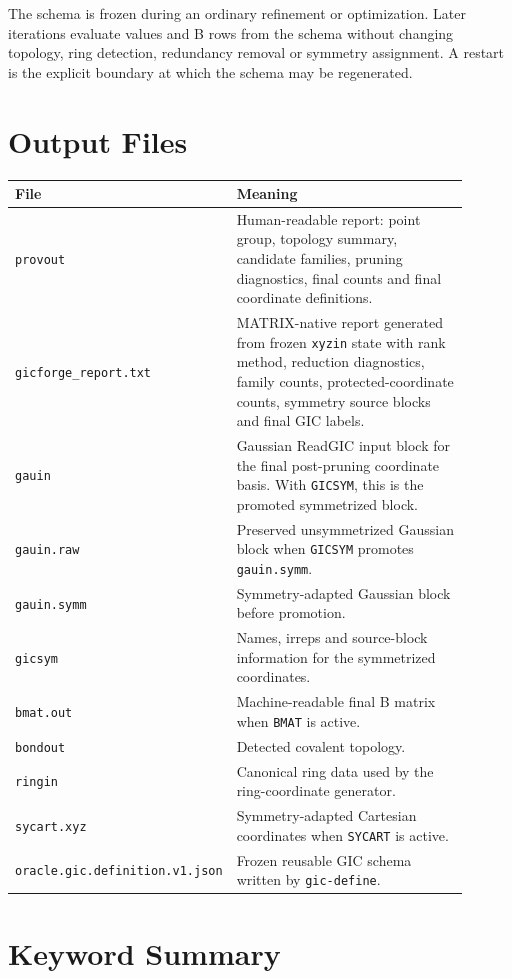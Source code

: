 \documentclass[11pt]{article}
\newcommand{\xyzin}{\texttt{xyzin}}
\newcommand{\provout}{\texttt{provout}}
\newcommand{\gauin}{\texttt{gauin}}
\newcommand{\gicsym}{\texttt{gicsym}}
\begin{document}
\noindent
The schema is frozen during an ordinary refinement or optimization.  Later
iterations evaluate values and B rows from the schema without changing
topology, ring detection, redundancy removal or symmetry assignment.  A restart
is the explicit boundary at which the schema may be regenerated.

\section{Output Files}

\begin{longtable}{@{}p{0.33\linewidth}p{0.57\linewidth}@{}}
\toprule
File & Meaning \\
\midrule
\endhead
\provout{} & Human-readable report: point group, topology summary, candidate
families, pruning diagnostics, final counts and final coordinate definitions. \\
\texttt{gicforge\_report.txt} & MATRIX-native report generated from frozen
\xyzin{} state with rank method, reduction diagnostics, family counts,
protected-coordinate counts, symmetry source blocks and final GIC labels. \\
\gauin{} & Gaussian ReadGIC input block for the final post-pruning coordinate
basis.  With \texttt{GICSYM}, this is the promoted symmetrized block. \\
\texttt{gauin.raw} & Preserved unsymmetrized Gaussian block when \texttt{GICSYM}
promotes \texttt{gauin.symm}. \\
\texttt{gauin.symm} & Symmetry-adapted Gaussian block before promotion. \\
\gicsym{} & Names, irreps and source-block information for the symmetrized
coordinates. \\
\texttt{bmat.out} & Machine-readable final B matrix when \texttt{BMAT} is
active. \\
\texttt{bondout} & Detected covalent topology. \\
\texttt{ringin} & Canonical ring data used by the ring-coordinate generator. \\
\texttt{sycart.xyz} & Symmetry-adapted Cartesian coordinates when
\texttt{SYCART} is active. \\
\texttt{oracle.gic.definition.}\newline\texttt{v1.json} & Frozen reusable GIC schema written by
\texttt{gic-define}. \\
\bottomrule
\end{longtable}

\section{Keyword Summary}
\end{document}
